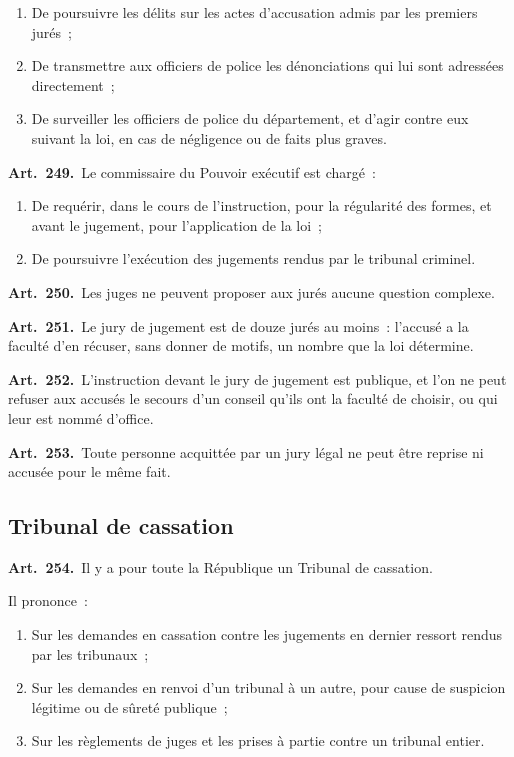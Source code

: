 \documentclass[french,twoside]{book} %
\newcommand{\labelchar}[1]{\textbf{\color{rubric} #1}}
\begin{document}
\begin{enumerate}[itemsep=0pt,topsep=0pt,partopsep=0pt,parskip=0pt]
\item De poursuivre les délits sur les actes d’accusation admis par les premiers jurés ;
\item De transmettre aux officiers de police les dénonciations qui lui sont adressées directement ;
\item De surveiller les officiers de police du département, et d’agir contre eux suivant la loi, en cas de négligence ou de faits plus graves.
\end{enumerate}

\labelchar{Art. 249.} Le commissaire du Pouvoir exécutif est chargé :\par

\begin{enumerate}[itemsep=0pt,topsep=0pt,partopsep=0pt,parskip=0pt]
\item De requérir, dans le cours de l’instruction, pour la régularité des formes, et avant le jugement, pour l’application de la loi ;
\item De poursuivre l’exécution des jugements rendus par le tribunal criminel.
\end{enumerate}

\labelchar{Art. 250.} Les juges ne peuvent proposer aux jurés aucune question complexe.\par
\labelchar{Art. 251.} Le jury de jugement est de douze jurés au moins : l’accusé a la faculté d’en récuser, sans donner de motifs, un nombre que la loi détermine.\par
\labelchar{Art. 252.} L’instruction devant le jury de jugement est publique, et l’on ne peut refuser aux accusés le secours d’un conseil qu’ils ont la faculté de choisir, ou qui leur est nommé d’office.\par
\labelchar{Art. 253.} Toute personne acquittée par un jury légal ne peut être reprise ni accusée pour le même fait.

\subsection[{Tribunal de cassation}]{Tribunal de cassation}

\labelchar{Art. 254.} Il y a pour toute la République un Tribunal de cassation.\par
Il prononce :\par

\begin{enumerate}[itemsep=0pt,topsep=0pt,partopsep=0pt,parskip=0pt]
\item Sur les demandes en cassation contre les jugements en dernier ressort rendus par les tribunaux ;
\item Sur les demandes en renvoi d’un tribunal à un autre, pour cause de suspicion légitime ou de sûreté publique ;
\item Sur les règlements de juges et les prises à partie contre un tribunal entier.
\end{enumerate}
\end{document}
